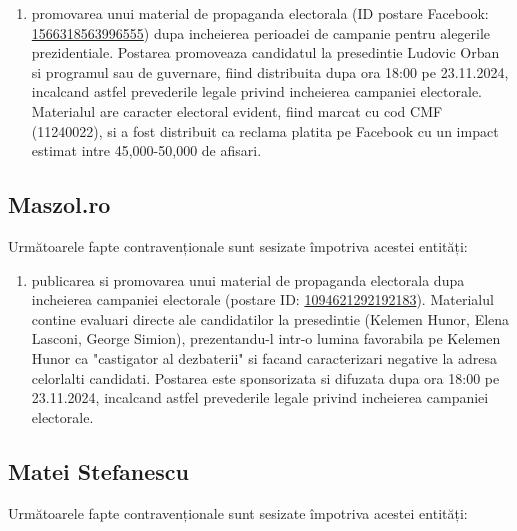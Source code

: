 \documentclass[a4paper,12pt]{article}
\begin{document}
\begin{enumerate}[leftmargin=*, label=\arabic*.)]
    \item promovarea unui material de propaganda electorala (ID postare Facebook: \href{https://www.facebook.com/ads/library/?id=1566318563996555}{1566318563996555}) dupa incheierea perioadei de campanie pentru alegerile prezidentiale. Postarea promoveaza candidatul la presedintie Ludovic Orban si programul sau de guvernare, fiind distribuita dupa ora 18:00 pe 23.11.2024, incalcand astfel prevederile legale privind incheierea campaniei electorale. Materialul are caracter electoral evident, fiind marcat cu cod CMF (11240022), si a fost distribuit ca reclama platita pe Facebook cu un impact estimat intre 45,000-50,000 de afisari.
\end{enumerate}

\vspace{0.5cm}

\subsection{Maszol.ro}
Următoarele fapte contravenționale sunt sesizate împotriva acestei entități:

\begin{enumerate}[leftmargin=*, label=\arabic*.)]
    \item publicarea si promovarea unui material de propaganda electorala dupa incheierea campaniei electorale (postare ID: \href{https://www.facebook.com/ads/library/?id=1094621292192183}{1094621292192183}). Materialul contine evaluari directe ale candidatilor la presedintie (Kelemen Hunor, Elena Lasconi, George Simion), prezentandu-l intr-o lumina favorabila pe Kelemen Hunor ca "castigator al dezbaterii" si facand caracterizari negative la adresa celorlalti candidati. Postarea este sponsorizata si difuzata dupa ora 18:00 pe 23.11.2024, incalcand astfel prevederile legale privind incheierea campaniei electorale.
\end{enumerate}

\vspace{0.5cm}

\subsection{Matei Stefanescu}
Următoarele fapte contravenționale sunt sesizate împotriva acestei entități:
\end{document}
